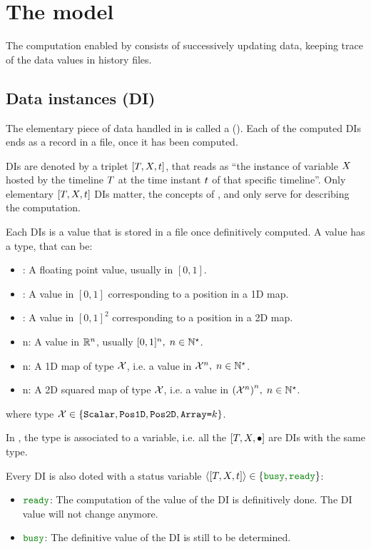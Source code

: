 

\section{The model}

The computation enabled by \CxSOM consists of successively updating data, keeping trace of the data values in history files.

\subsection{Data instances (DI)}

The elementary piece of data handled in \CxSOM is called a  (). Each of the computed DIs ends as a record in a file, once it has been computed.

DIs are denoted by a triplet ${{\left[T,X,t\right]}}$, that reads as ``the instance of variable $X$ hosted by the timeline $T$ at the time instant $t$ of that specific timeline''. Only elementary ${{\left[T,X,t\right]}}$ DIs matter, the concepts of ,  and  only serve for describing the computation.

Each DIs is a value that is stored in a file once definitively computed. A value has a type, that can be:
\begin{itemize}
\item \Scalar: A floating point value, usually in $[0,1]$.
  \item {}: A value in $[0,1]$ corresponding to a position in a 1D map.
  \item {}: A value in $[0,1]^2$ corresponding to a position in a 2D map.
  \item \Array n: A value in ${\mathbb{R}}^n$, usually $[0,1]^n,\; n \in {{\mathbb{N}}^\star}$.
  \item {}n: A 1D map of type $\cal X$, i.e. a value in ${\cal X}^n,\; n \in {{\mathbb{N}}^\star}$.
  \item {}n: A 2D squared map of type $\cal X$, i.e. a value in ${\left({{\cal X}^n}\right)}^{n},\; n \in {{\mathbb{N}}^\star}$.
\end{itemize}
where type $\cal X \in \left\{ {\mbox{{\tt Scalar}}, \mbox{{\tt Pos{1}D}}, \mbox{{\tt Pos{2}D}}, \mbox{{{\tt Array=}$k$}}} \right\}$.

In \CxSOM, the type is associated to a variable, i.e. all the ${\left[T,X,\bullet\right]}$ are DIs with the same type.

Every DI is also doted with a status variable $\Status\DftDI \in \Set{\Busy, \Ready}$:
\begin{itemize}
  \item $\Ready$: The computation of the value of the DI is definitively done. The DI value will not change anymore.
  \item $\Busy$: The definitive value of the DI is still to be determined.
\end{itemize}

